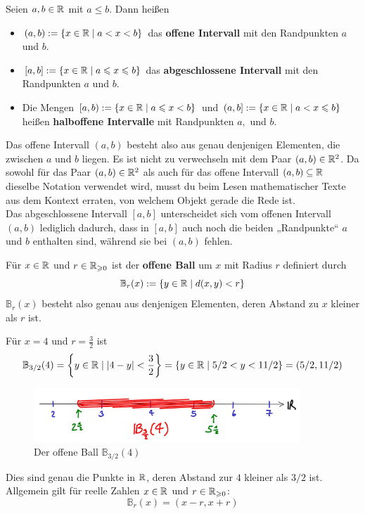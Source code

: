 \begin{de}[Intervalle in $\Rz$]
 Seien $a,b\in {\mathbb R}$ mit $a\leq b$. Dann heißen
 \begin{itemize}
  \item $(a,b) := \{ x\in {\mathbb R} \mid a<x<b \}$ das \textbf{offene Intervall} mit den Randpunkten $a$ und $b$. 
  \item $[a,b] := \{ x\in {\mathbb R} \mid a\leqslant x\leqslant b \}$ das \textbf{abgeschlossene Intervall} mit den Randpunkten $a$ und $b$.
  \item Die Mengen $[a,b) := \{ x\in {\mathbb R} \mid a\leqslant x<b \}$ und $(a,b] := \{ x\in {\mathbb R} \mid a<x\leqslant b \}$ heißen \textbf{halboffene Intervalle} mit Randpunkten $a,$ und $b$. 
 \end{itemize}
\end{de}



\begin{bem}
 Das offene Intervall $(a,b)$ besteht also aus genau denjenigen Elementen, die zwischen $a$ und $b$ liegen. Es ist nicht zu verwechseln mit dem Paar $(a,b)\in {\mathbb R}^2$. Da sowohl für das Paar $(a,b)\in {\mathbb R}^2$ als auch für das offene Intervall $(a,b)\subseteq {\mathbb R}$ dieselbe Notation verwendet wird, musst du beim Lesen mathematischer Texte aus dem Kontext erraten, von welchem Objekt gerade die Rede ist. \\[0.5em]
 Das abgeschlossene Intervall $[a,b]$ unterscheidet sich vom offenen Intervall $(a,b)$ lediglich dadurch, dass in $[a,b]$ auch noch die beiden „Randpunkte“ $a$ und $b$ enthalten sind, während sie bei $(a,b)$ fehlen.
\end{bem}



\begin{de}
 Für $x\in {\mathbb R}$ und $r\in {\mathbb R}_{\geqslant 0}$ ist der \textbf{offene Ball} um $x$ mit Radius $r$ definiert durch
 \[ \mathbb{B}_r(x) := \{ y\in {\mathbb R} \mid d(x,y)< r\} \]
$\mathbb{B}_r(x)$ besteht also genau aus denjenigen Elementen, deren Abstand zu $x$ kleiner als $r$ ist.
\end{de}


\begin{bsp}
 Für $x=4$ und $r= \frac{3}{2}$ ist
 \[ \mathbb{B}_{3/2}(4) = \left\{ y\in {\mathbb R}\mid \vert 4-y\vert <\frac{3}{2} \right\} = \left\{ y\in {\mathbb R}\mid 5/2<y<11/2 \right\} = \left(5/2,11/2\right) \]
    \begin{figure}[H]
\begin{center}
\includegraphics[width=10cm]{./_img/1Dball.jpeg}
\end{center}
\centering \caption{Der offene Ball $\mathbb{B}_{3/2}(4)$}
\end{figure}
 Dies sind genau die Punkte in $\Rz$, deren Abstand zur $4$ kleiner als $3/2$ ist. Allgemein gilt für reelle Zahlen $x\in {\mathbb R}$ und $r\in {\mathbb R}_{\geqslant 0}$:
 \[ \mathbb{B}_r(x) = (x-r,x+r) \]
\end{bsp}


